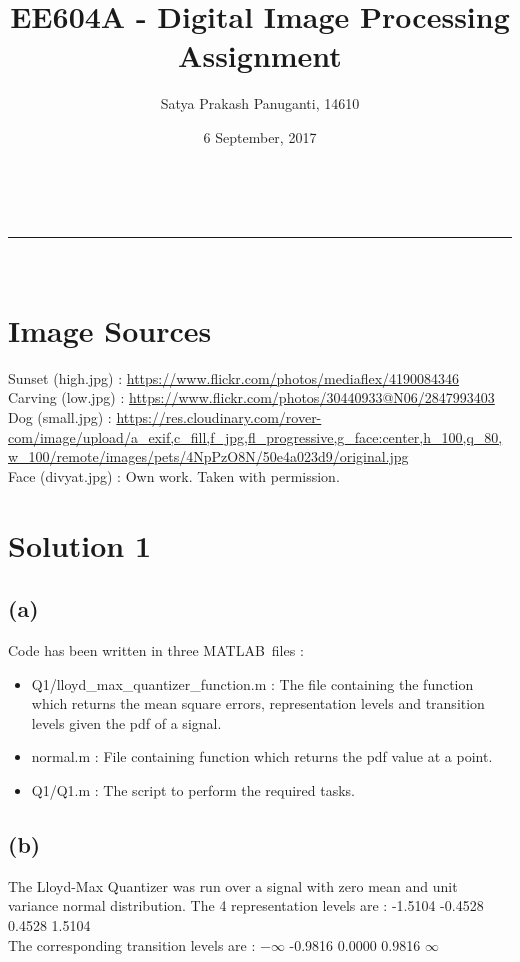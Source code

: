 \documentclass[a4paper,fleqn,11pt]{article}
\makeatletter
\newcommand{\linia}{\rule{\linewidth}{0.5pt}}
\theoremstyle{mytheor}
\renewcommand{\maketitle}{
\begin{center}
\vspace{2ex}
{\huge \textsc{\@title}}
\vspace{1ex}
\\
\linia\\
\@author \hfill \@date
\vspace{4ex}
\end{center}
}
\makeatother
\begin{document}
\title{EE604A - Digital Image Processing Assignment}

\author{Satya Prakash Panuganti, 14610}

\date{6 September, 2017}

\maketitle

\section*{Image Sources}
Sunset  (high.jpg)  : \url{https://www.flickr.com/photos/mediaflex/4190084346} \\
Carving (low.jpg)   : \url{https://www.flickr.com/photos/30440933@N06/2847993403} \\
Dog     (small.jpg) : \url{https://res.cloudinary.com/rover-com/image/upload/a_exif,c_fill,f_jpg,fl_progressive,g_face:center,h_100,q_80,w_100/remote/images/pets/4NpPzO8N/50e4a023d9/original.jpg} \\
Face (divyat.jpg)   : Own work. Taken with permission.
\section*{Solution 1}
\subsection*{(a)}
Code has been written in three MATLAB\textregistered\ files :
\begin{itemize}
\item Q1/lloyd\_max\_quantizer\_function.m : The file containing the function which returns the mean square errors, representation levels and transition levels given the pdf of a signal.
\item normal.m : File containing function which returns the pdf value at a point.
\item Q1/Q1.m : The script to perform the required tasks.
\end{itemize}
\subsection*{(b)}
The Lloyd-Max Quantizer was run over a signal with zero mean and unit variance normal distribution.
The 4 representation levels are : -1.5104  -0.4528  0.4528  1.5104 \\
The corresponding transition levels are : $-\infty$  -0.9816  0.0000  0.9816  $\infty$
\end{document}
